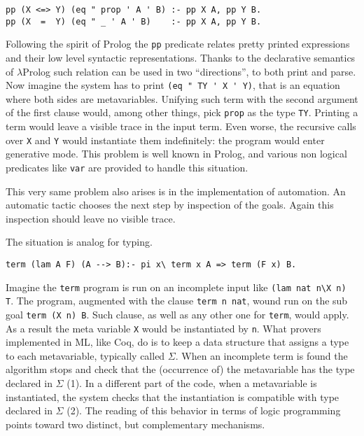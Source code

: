 \documentclass[preprint]{sigplanconf}
\begin{document}
{\small
\begin{verbatim}
pp (X <=> Y) (eq " prop ' A ' B) :- pp X A, pp Y B.
pp (X  =  Y) (eq " _ ' A ' B)    :- pp X A, pp Y B.
\end{verbatim}
}

Following the spirit of Prolog the \verb+pp+ predicate relates
pretty printed expressions and their low level syntactic representations.
Thanks to the declarative semantics of $\lambda$Prolog such relation can be
used in two ``directions'', to both print and parse.  Now imagine
the system has to print \verb+(eq " TY ' X ' Y)+, that is an equation
where both sides are metavariables.  Unifying such term with the
second argument of the first clause would, among other things, pick
\verb+prop+ as the type \verb+TY+.  Printing a term would leave a
visible trace in the input term.  Even worse, the recursive calls
over \verb+X+ and \verb+Y+ would instantiate them indefinitely: the program
would enter generative mode.  This problem is well known in Prolog, and
various non logical predicates like \verb+var+ are provided to handle
this situation.

This very same problem also arises is in the
implementation of automation. An automatic tactic chooses the next step
by inspection of the goals.  Again this inspection should leave no visible
trace.

The situation is analog for typing.  
{\small
\begin{verbatim}
term (lam A F) (A --> B):- pi x\ term x A => term (F x) B.
\end{verbatim}
}

Imagine the \verb+term+ program
is run on an incomplete input like \verb+(lam nat n\X n) T+.
The program, augmented with the clause \verb+term n nat+, wound run
on the sub goal \verb+term (X n) B+.
Such clause, as well as any other one for \verb+term+, would apply.  As a result
the meta variable \verb+X+ would be instantiated by \verb+n+.
What provers implemented in ML, like Coq, do is to keep
a data structure that assigns a type to each metavariable, typically called
$\Sigma$.  When an incomplete term is found the algorithm stops and check
that the (occurrence of) the metavariable has the type declared in $\Sigma$ (1).
In a different part of the code, when a metavariable is instantiated, the system
checks that the instantiation is compatible with type declared in $\Sigma$ (2).
The reading of this behavior in terms of logic programming points toward two distinct, but complementary mechanisms.  
\end{document}
